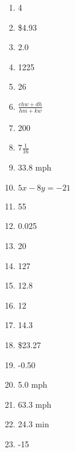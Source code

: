 \documentclass[../uilmath.tex]{subfiles}
\begin{document}
\begin{enumerate}[label=\bfseries\arabic*.]
    \item %
    4

    \item %
    \$4.93 

    \item %
    2.0 

    \item %
    1225 

    \item %
    26

    \item %
    $\frac{chw+dh}{hm+kw}$

    \item %
    200

    \item %
    $7\frac{1}{16}$

    \item %
    33.8 mph

    \item %
    $5x-8y=-21$

    \item %
    55

    \item %
    0.025 

    \item %
    20

    \item %
    127

    \item %
    12.8

    \item %
    12

    \item %
    14.3

    \item %
    \$23.27

    \item %
    -0.50 

    \item %
    5.0 mph

    \item %
    63.3 mph 

    \item %
    24.3 min 

    \item %
    -15 


\end{enumerate}
\end{document}
